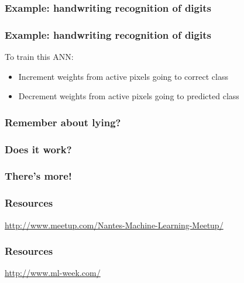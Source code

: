 \begin{frame}
  \frametitle{Example: handwriting recognition of digits}
\end{frame}

\begin{frame}
  \frametitle{Example: handwriting recognition of digits}
  To train this ANN:
  \begin{itemize}
  \item<1-> Increment weights from active pixels going to correct class
  \item<1-> Decrement weights from active pixels going to predicted class
  \end{itemize}
\end{frame}

\begin{frame}
  \frametitle{Remember about lying?}
\end{frame}

\begin{frame}
  \frametitle{Does it work?}
\end{frame}

\begin{frame}
  \frametitle{There's more!}
\end{frame}


\begin{frame}
  \frametitle{Resources}
  

  \vspace{5mm}
  \centerline{\large\url{http://www.meetup.com/Nantes-Machine-Learning-Meetup/}}
\end{frame}

\begin{frame}
  \frametitle{Resources}

  \vspace{5mm}
  \centerline{\url{http://www.ml-week.com/}}
\end{frame}

\begin{frame}
\end{frame}


